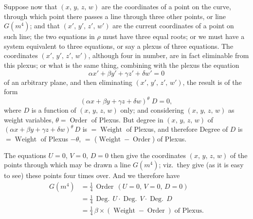 \documentclass[11pt,a4paper]{article}
\providecommand{\Order}{\operatorname{Order}}
\providecommand{\Weight}{\operatorname{Weight}}
\providecommand{\Deg}{\operatorname{Deg.}}
\begin{document}
Suppose now that $(x,\,y,\,z,\,w)$ are the coordinates of a point on the curve, through which point there passes a line through three other points, or line $G(m^4)$; and that $(x',\,y',\,z',\,w')$ are the current coordinates of a point on such line; the two equations in $\rho$ must have three equal roots; or we must have a system equivalent to three equations, or say a plexus of three equations. The coordinates $(x',\,y',\,z',\,w')$, although four in number, are in fact eliminable from this plexus; or what is the same thing, combining with the plexus the equation
\[
\alpha x' + \beta y' + \gamma z' + \delta w' = 0
\]
of an arbitrary plane, and then eliminating $(x',\,y',\,z',\,w')$, the result is of the form
\[
(\alpha x + \beta y + \gamma z + \delta w)^\theta\;D = 0,
\]
where $D$ is a function of $(x,\,y,\,z,\,w)$ only; and considering $(x,\,y,\,z,\,w)$ as weight variables, $\theta = \Order$ of Plexus. But degree in $(x,\,y,\,z,\,w)$ of $(\alpha x + \beta y + \gamma z + \delta w)^\theta\,D$ is $= \Weight$ of Plexus, and therefore Degree of $D$ is $= \Weight$ of Plexus $-\theta$, $=$ ($\Weight - \Order$) of Plexus.

\medskip

The equations $U = 0$, $V = 0$, $D = 0$ then give the coordinates $(x,\,y,\,z,\,w)$ of the points through which may be drawn a line $G(m^4)$; viz.\ they give (as it is easy to see) these points four times over. And we therefore have
\begin{align*}
G(m^4) &= \tfrac{1}{4}\,\Order\,(U=0,\,V=0,\,D=0)\\
&= \tfrac{1}{4}\,\Deg\,U \cdot \Deg\,V \cdot \Deg\,D\\
&= \tfrac{1}{4}\,\beta \times (\Weight - \Order)\;\text{of Plexus}.
\end{align*}

\medskip
\end{document}
